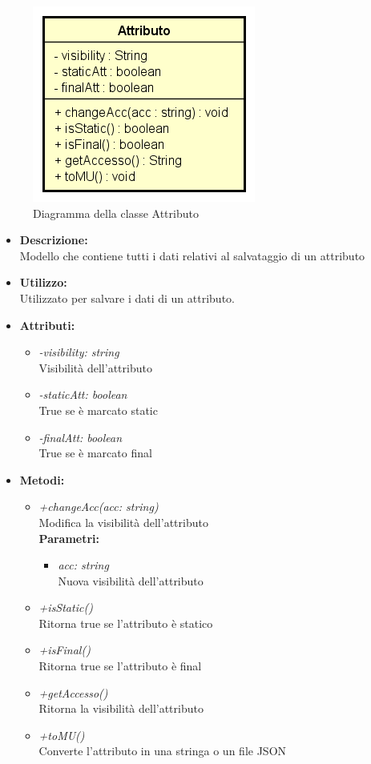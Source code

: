 \begin{figure}[h!]
	\centering
	\includegraphics[scale=0.8]{res/sections/SpecificaFrontEnd/Services/Disegnetti/attributo.png}
	\caption{Diagramma della classe Attributo}
\end{figure}

\begin{itemize}
	\item \textbf{Descrizione:}\\
	Modello che contiene tutti i dati relativi al salvataggio di un attributo
	\item \textbf{Utilizzo:}\\
	Utilizzato per salvare i dati di un attributo.
	\item \textbf{Attributi:}
		\begin{itemize}
			\item \emph{-visibility: string}\\
			Visibilità dell'attributo
			\item \emph{-staticAtt: boolean}\\
			True se è marcato static
			\item \emph{-finalAtt: boolean}\\
			True se è marcato final
		\end{itemize}
	\item \textbf{Metodi:}
		\begin{itemize}
			\item \emph{+changeAcc(acc: string)}\\
    		Modifica la visibilità dell'attributo\\
    		\textbf{Parametri:}
    		\begin{itemize}
    			\item \emph{acc: string}\\
    			Nuova visibilità dell'attributo
    		\end{itemize}
    		\item \emph{+isStatic()}\\
    		Ritorna true se l'attributo è statico
    		\item \emph{+isFinal()}\\
    		Ritorna true se l'attributo è final
    		\item \emph{+getAccesso()}\\
    		Ritorna la visibilità dell'attributo
    		\item \emph{+toMU()}\\
    		Converte l'attributo in una stringa o un file JSON
    	\end{itemize}
\end{itemize}